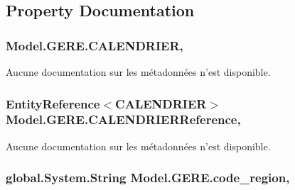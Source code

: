 \subsection{Property Documentation}
\hypertarget{class_model_1_1_g_e_r_e_a449b547ec0dae7611bdb626f4a712c2e}{
\subsubsection[{C\-A\-L\-E\-N\-D\-R\-I\-E\-R}]{ Model.\-G\-E\-R\-E.\-C\-A\-L\-E\-N\-D\-R\-I\-E\-R\hspace{0.3cm}{\ttfamily [get]}, {\ttfamily [set]}}}\label{class_model_1_1_g_e_r_e_a449b547ec0dae7611bdb626f4a712c2e}


Aucune documentation sur les métadonnées n'est disponible. 

\hypertarget{class_model_1_1_g_e_r_e_a480b3df645ec158a0f1072ed6863e5e7}{
\subsubsection[{C\-A\-L\-E\-N\-D\-R\-I\-E\-R\-Reference}]{\setlength{\rightskip}{0pt plus 5cm}Entity\-Reference$<${\bf C\-A\-L\-E\-N\-D\-R\-I\-E\-R}$>$ Model.\-G\-E\-R\-E.\-C\-A\-L\-E\-N\-D\-R\-I\-E\-R\-Reference\hspace{0.3cm}{\ttfamily [get]}, {\ttfamily [set]}}}\label{class_model_1_1_g_e_r_e_a480b3df645ec158a0f1072ed6863e5e7}


Aucune documentation sur les métadonnées n'est disponible. 

\hypertarget{class_model_1_1_g_e_r_e_ab75ef8c99d225e8c5e4cf95012d54287}{
\subsubsection[{code\-\_\-region}]{\setlength{\rightskip}{0pt plus 5cm}global.\-System.\-String Model.\-G\-E\-R\-E.\-code\-\_\-region\hspace{0.3cm}{\ttfamily [get]}, {\ttfamily [set]}}}\label{class_model_1_1_g_e_r_e_ab75ef8c99d225e8c5e4cf95012d54287}


